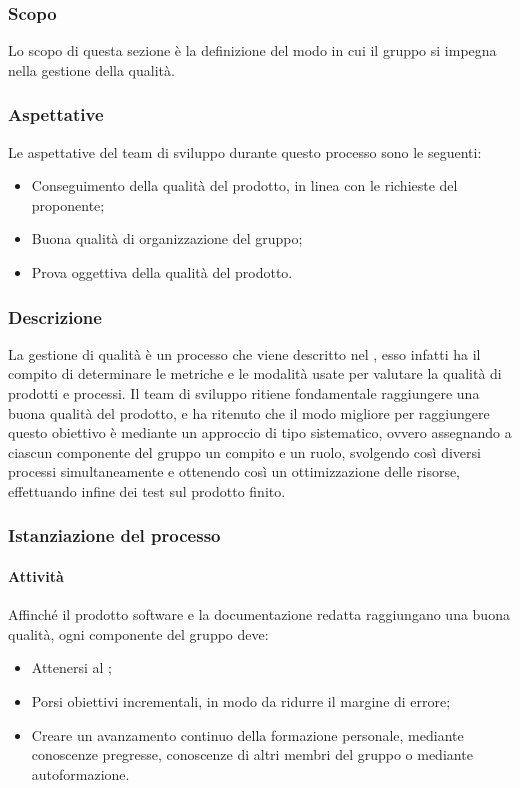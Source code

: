 \subsubsection{Scopo}
Lo scopo di questa sezione è la definizione del modo in cui il gruppo si impegna nella gestione della qualità.
\subsubsection{Aspettative}
Le aspettative del team di sviluppo durante questo processo sono le seguenti:
\begin {itemize}
\item Conseguimento della qualità del prodotto, in linea con le richieste del proponente;
\item Buona qualità di organizzazione del gruppo;
\item Prova oggettiva della qualità del prodotto.
\end {itemize}
\subsubsection{Descrizione}
La gestione di qualità è un processo che viene descritto nel \docNamePdQLow{}, esso infatti ha il compito di determinare le metriche e le modalità usate per valutare la qualità di prodotti e processi.
Il team di sviluppo ritiene fondamentale raggiungere una buona qualità del prodotto, e ha ritenuto che il modo migliore per raggiungere questo obiettivo è mediante un approccio di tipo sistematico, ovvero assegnando a ciascun componente del gruppo un compito e un ruolo, svolgendo così diversi processi simultaneamente e ottenendo così un ottimizzazione delle risorse, effettuando infine dei test sul prodotto finito.
\subsubsection{Istanziazione del processo}
\paragraph{Attività}
Affinché il prodotto software e la documentazione redatta raggiungano una buona qualità, ogni componente del gruppo \groupName{} deve:
\begin{itemize}
\item Attenersi al \docNamePdQLow{};
\item Porsi obiettivi incrementali, in modo da ridurre il margine di errore;
\item Creare un avanzamento continuo della formazione personale, mediante conoscenze pregresse, conoscenze di altri membri del gruppo o mediante autoformazione.
\end {itemize}
